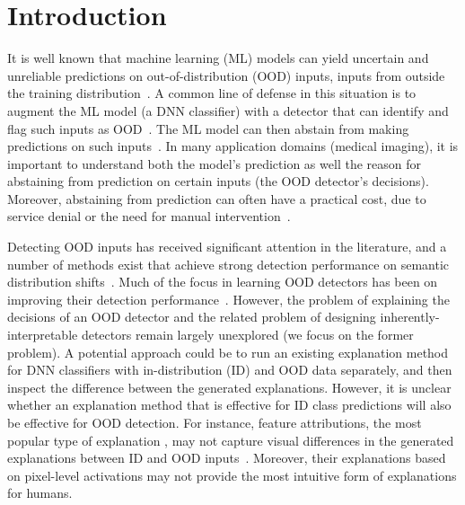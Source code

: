 \section{Introduction}

It is well known that machine learning (ML) models can yield uncertain and unreliable predictions on out-of-distribution (OOD) inputs, \ie inputs from outside the training distribution~\citep{amodei2016AISafety,goodfellow2015explaining,hendrycks2021many}.
A common line of defense in this situation is to augment the ML model (\eg a DNN classifier) with a detector that can identify and flag such inputs as OOD~\citep{hendrycks2016msp, liang2018ODIN}. 
The ML model can then abstain from making predictions on such inputs~\citep{tax2008growing, geifman2019selectivenet}.
In many application domains (\eg medical imaging), it is important to understand both the model's prediction as well the reason for abstaining from prediction on certain inputs (\ie the OOD detector's decisions).
Moreover, abstaining from prediction can often have a practical cost, \eg due to service denial or the need for manual intervention~\citep{markoff2016self, mozannar2020consistent}.


Detecting OOD inputs has received significant attention in the literature, and a number of methods exist that achieve strong detection performance on semantic distribution shifts~\cite{yang2021survey, yang2022openood}.
Much of the focus in learning OOD detectors has been on improving their detection performance~\citep{hendrycks2018OE, liu2020energy, mohseni2020self, lin2021MOOD, chen2021atom, sun2021react, cao2022deep}. 
However, the problem of explaining the decisions of an OOD detector and the related problem of designing inherently-interpretable detectors remain largely unexplored (we focus on the former problem). 
A potential approach could be to run an existing explanation method for DNN classifiers with in-distribution (ID) and OOD data separately, and then inspect the difference between the generated explanations. However, it is unclear whether an explanation method that is effective for ID class predictions will also be effective for OOD detection. For instance, feature attributions, the most popular type of explanation \citep{sundararajan2017IG,ribeiro2016LIME}, may not capture visual differences in the generated explanations between ID and OOD inputs~\citep{adebayo2020debugging}.
Moreover, their explanations based on pixel-level activations may not provide the most intuitive form of explanations for humans.

